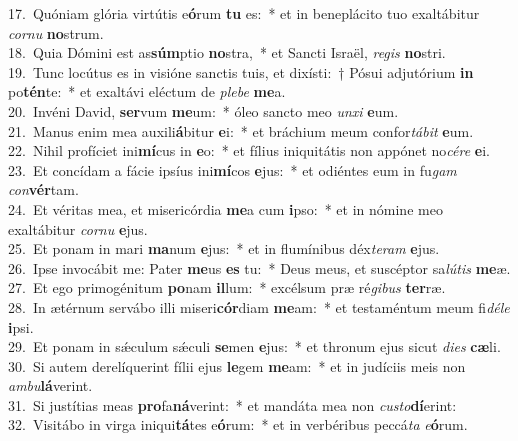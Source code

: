 {17.~}Quóniam glória virtútis e\textbf{ó}rum \textbf{tu} es:~* et in beneplácito tuo exaltábitur \textit{cor}\textit{nu} \textbf{no}strum.\\
{18.~}Quia Dómini est as\textbf{súm}ptio \textbf{no}stra,~* et Sancti Israël, \textit{re}\textit{gis} \textbf{no}stri.\\
{19.~}Tunc locútus es in visióne sanctis tuis, et dixísti:~† Pósui adjutórium \textbf{in} po\textbf{tén}te:~* et exaltávi eléctum de \textit{ple}\textit{be} \textbf{me}a.\\
{20.~}Invéni David, \textbf{ser}vum \textbf{me}um:~* óleo sancto meo \textit{un}\textit{xi} \textbf{e}um.\\
{21.~}Manus enim mea auxili\textbf{á}bitur \textbf{e}i:~* et bráchium meum confor\textit{tá}\textit{bit} \textbf{e}um.\\
{22.~}Nihil profíciet ini\textbf{mí}cus in \textbf{e}o:~* et fílius iniquitátis non appónet no\textit{cé}\textit{re} \textbf{e}i.\\
{23.~}Et concídam a fácie ipsíus ini\textbf{mí}cos \textbf{e}jus:~* et odiéntes eum in fu\textit{gam} \textit{con}\textbf{vér}tam.\\
{24.~}Et véritas mea, et misericórdia \textbf{me}a cum \textbf{i}pso:~* et in nómine meo exaltábitur \textit{cor}\textit{nu} \textbf{e}jus.\\
{25.~}Et ponam in mari \textbf{ma}num \textbf{e}jus:~* et in flumínibus déx\textit{te}\textit{ram} \textbf{e}jus.\\
{26.~}Ipse invocábit me: Pater \textbf{me}us \textbf{es} tu:~* Deus meus, et suscéptor sa\textit{lú}\textit{tis} \textbf{me}æ.\\
{27.~}Et ego primogénitum \textbf{po}nam \textbf{il}lum:~* excélsum præ ré\textit{gi}\textit{bus} \textbf{ter}ræ.\\
{28.~}In ætérnum servábo illi miseri\textbf{cór}diam \textbf{me}am:~* et testaméntum meum fi\textit{dé}\textit{le} \textbf{i}psi.\\
{29.~}Et ponam in sǽculum sǽculi \textbf{se}men \textbf{e}jus:~* et thronum ejus sicut \textit{di}\textit{es} \textbf{cæ}li.\\
{30.~}Si autem derelíquerint fílii ejus \textbf{le}gem \textbf{me}am:~* et in judíciis meis non \textit{am}\textit{bu}\textbf{lá}verint.\\
{31.~}Si justítias meas \textbf{pro}fa\textbf{ná}verint:~* et mandáta mea non \textit{cu}\textit{sto}\textbf{dí}erint:\\
{32.~}Visitábo in virga iniqui\textbf{tá}tes e\textbf{ó}rum:~* et in verbéribus peccá\textit{ta} \textit{e}\textbf{ó}rum.\\
